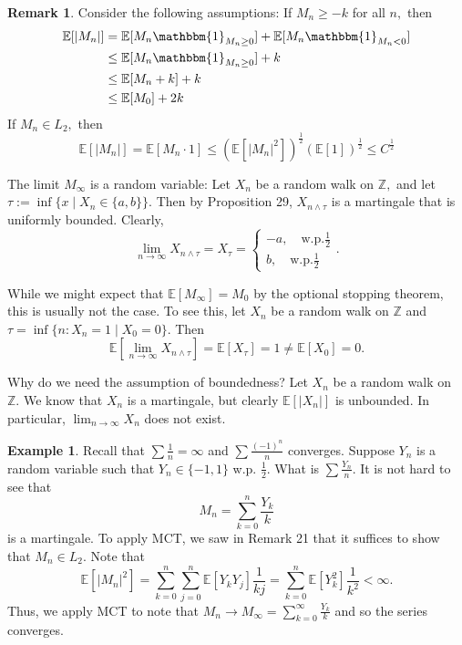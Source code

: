 \documentclass[10pt, oneside]{article}
\newcommand{\bbZ}{\mathbb{Z}}
\newcommand{\bbE}{\mathbb{E}}
\theoremstyle{definition}
\newtheorem{exmp}{Example}[section]
\newtheorem{rem}{Remark}
\begin{document}
\begin{rem}
Consider the following assumptions:
    If $M_n \geq -k$ for all $n,$ then 
    \begin{align*}
        \bbE[|M_n|] &= \bbE[M_n \mathbbm{1}_{M_n \geq 0}] +\bbE[M_n \mathbbm{1}_{M_n < 0}] \\
        &\leq \bbE[M_n \mathbbm{1}_{M_n \geq 0}] + k\\
        &\leq \bbE[M_n + k] + k\\
        &\leq \bbE[M_0] + 2k
    \end{align*}
    If $M_n \in L_2,$ then 
    \[\bbE[|M_n|] = \bbE[M_n \cdot 1] \leq \left(\bbE[|M_n|^2]\right)^\frac{1}{2}\left(\bbE[1]\right)^\frac{1}{2} \leq C^\frac{1}{2}\]

    The limit $M_\infty$ is a random variable: Let $X_n$ be a random walk on $\bbZ,$ and let $\tau := \inf \{x \mid X_n \in \{a, b\}\}.$ Then by Proposition 29, $X_{n\wedge \tau}$ is a martingale that is uniformly bounded. Clearly, \[\lim_{n\to \infty} X_{n\wedge \tau} = X_\tau =\begin{cases}
        -a, \quad \text{w.p.} \frac{1}{2}\\
        b, \quad \text{w.p.} \frac{1}{2}
    \end{cases}.\] 
    
    While we might expect that $\bbE[M_\infty] = M_0$ by the optional stopping theorem, this is usually not the case. To see this, let $X_n$ be a random walk on $\bbZ$ and $\tau = \inf\{n : X_n= 1 \mid X_0 = 0\}.$ Then 
    \[\bbE[\lim_{n\to \infty} X_{n\wedge \tau}] = \bbE[X_\tau] = 1 \neq \bbE[X_0] = 0.\]

    Why do we need the assumption of boundedness? Let $X_n$ be a random walk on $\bbZ.$ We know that $X_n$ is a martingale, but clearly $\bbE[|X_n|]$ is unbounded. In particular, 
    $\displaystyle\lim_{n\to \infty} X_n$ does not exist.
\end{rem}

\begin{exmp}
    Recall that $\sum \frac{1}{n} = \infty$ and $\sum \frac{(-1)^n}{n}$ converges. Suppose $Y_n$ is a random variable such that $Y_n \in \{-1, 1\}$ w.p. $\frac{1}{2}.$ What is $\sum \frac{Y_n}{n}.$ It is not hard to see that 
    \[M_n = \sum_{k=0}^n \frac{Y_k}{k}\] is a martingale. To apply MCT, we saw in Remark 21 that it suffices to show that $M_n \in L_2.$ Note that 
    \[\bbE[|M_n|^2] = \sum_{k=0}^n \sum_{j=0}^n \bbE[Y_k Y_j] \frac{1}{kj} = \sum_{k=0}^n \bbE[Y_k^2]\frac{1}{k^2} < \infty.\] Thus, we apply MCT to note that $M_n \to M_\infty = \displaystyle\sum_{k=0}^\infty \frac{Y_k}{k}$ and so the series converges.
\end{exmp}
\end{document}
